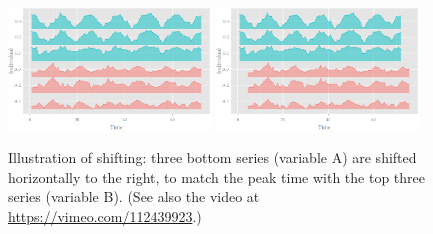 \documentclass[12pt]{article}
\begin{document}
\begin{center}
\begin{figure}[htp]
\begin{centering}
\includegraphics[width=0.48\textwidth]{graph/pipeline-19-original}
\includegraphics[width=0.48\textwidth]{graph/pipeline-19-shifting}
\end{centering}
\caption{\label{fig:x-shifting}Illustration of shifting: three bottom series (variable A) are shifted horizontally to the right, to match the peak time with the top three series (variable B). (See also the video at \url{https://vimeo.com/112439923}.)}
\end{figure}
\end{center}





\end{document}
